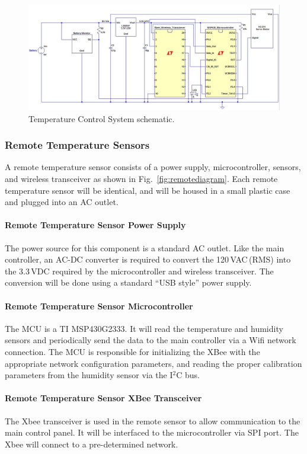 \begin{figure} [htb]
\centering
\includegraphics[width=.99\textwidth]{Temperature_Sensor.JPG}
\caption{Temperature Control System schematic.}
\label{fig:Temperature_System}
\end{figure}


\subsubsection{Remote Temperature Sensors}
A remote temperature sensor consists of a power supply, microcontroller, sensors, and wireless transceiver as shown in Fig.~\ref{fig:remotediagram}.  Each remote temperature sensor will be identical, and will be housed in a small plastic case and plugged into an AC outlet.
\paragraph{Remote Temperature Sensor Power Supply}
The power source for this component is a standard AC outlet.  Like the main controller, an AC-DC converter is required to convert the 120\,VAC\,(RMS) into the 3.3\,VDC required by the microcontroller and wireless transceiver.  The conversion will be done using a standard ``USB style'' power supply.
\paragraph{Remote Temperature Sensor Microcontroller}
The MCU is a TI MSP430G2333.  It will read the temperature and humidity sensors and periodically send the data to the main controller via a Wifi network connection.  The MCU is responsible for initializing the XBee with the appropriate network configuration parameters, and reading the proper calibration parameters from the humidity sensor via the I$^2$C bus.
\paragraph{Remote Temperature Sensor XBee Transceiver}
The Xbee transceiver is used in the remote sensor to allow communication to the main control panel. It will be interfaced to the microcontroller via SPI port.  The Xbee will connect to a pre-determined network.

